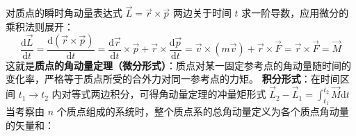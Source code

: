对质点的瞬时角动量表达式 $\vec{L} = \vec{r} \times \vec{p}$ 两边关于时间 $t$ 求一阶导数，应用微分的乘积法则展开：
\[
\frac{\mathrm{d}\vec{L}}{\mathrm{d}t} = \frac{\mathrm{d}(\vec{r} \times \vec{p})}{\mathrm{d}t} = \frac{\mathrm{d}\vec{r}}{\mathrm{d}t} \times \vec{p} + \vec{r} \times \frac{\mathrm{d}\vec{p}}{\mathrm{d}t}= \vec{v} \times (m\vec{v})+ \vec{r} \times \vec{F} = \vec{r} \times \vec{F}=\vec{M}
\]
这就是\textbf{质点的角动量定理（微分形式）}：质点对某一固定参考点的角动量随时间的变化率，严格等于质点所受的合外力对同一参考点的力矩。
\textbf{积分形式}：在时间区间 $t_1 \to t_2$ 内对等式两边积分，可得角动量定理的冲量矩形式 \(\vec{L}_2 - \vec{L}_1 = \int_{t_1}^{t_2} \vec{M}\mathrm{d}t\) 
当考察由 $n$ 个质点组成的系统时，整个质点系的总角动量定义为各个质点角动量的矢量和：

